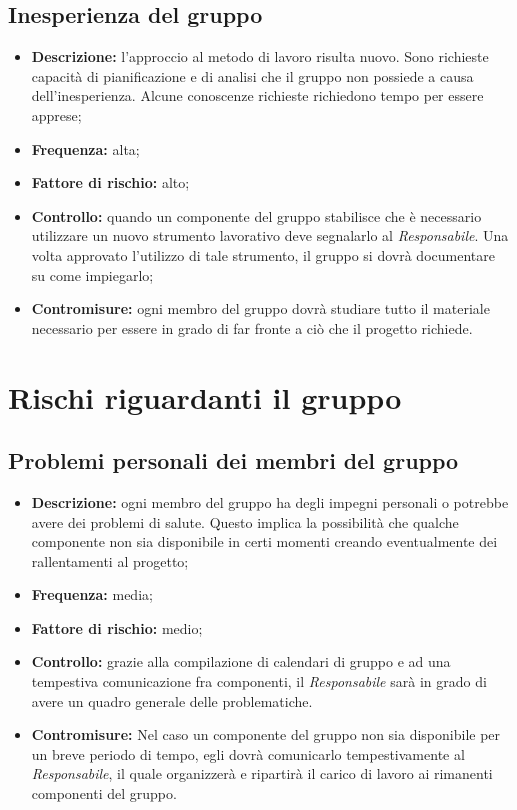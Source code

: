 \documentclass[./PianodiProgetto.tex]{subfiles}
\begin{document}
	\subsection{Inesperienza del gruppo}
	\begin{itemize}
		\item \textbf{Descrizione:} l'approccio al metodo di lavoro risulta nuovo. Sono richieste capacità di pianificazione e di analisi che il gruppo non possiede a causa dell'inesperienza. Alcune conoscenze richieste richiedono tempo per essere apprese;
		\item \textbf{Frequenza:} alta;
		\item \textbf{Fattore di rischio:} alto;
		\item \textbf{Controllo:} quando un componente del gruppo stabilisce che è necessario utilizzare un nuovo strumento lavorativo deve segnalarlo al  \textit{Responsabile}. Una volta approvato l'utilizzo di tale strumento, il gruppo si dovrà documentare su come impiegarlo;
		\item \textbf{Contromisure:} ogni membro del gruppo dovrà studiare tutto il materiale necessario per essere in grado di far fronte  a ciò che il progetto richiede.
	\end{itemize}
	
	\section{Rischi riguardanti il gruppo}
	\subsection{Problemi personali dei membri del gruppo}
	\begin{itemize}
		\item \textbf{Descrizione:} ogni membro del gruppo ha degli impegni personali o potrebbe avere dei problemi di salute. Questo implica la possibilità che qualche componente non sia disponibile in certi momenti creando eventualmente dei rallentamenti al progetto;
		\item \textbf{Frequenza:} media;
		\item \textbf{Fattore di rischio:} medio;
		\item \textbf{Controllo:} grazie alla compilazione di calendari di gruppo e ad una tempestiva comunicazione fra componenti, il \textit{Responsabile} sarà in grado di avere un quadro generale delle problematiche.
		\item \textbf{Contromisure:} Nel caso un componente del gruppo non sia disponibile per un breve periodo di tempo, egli dovrà comunicarlo tempestivamente al \textit{Responsabile}, il quale organizzerà e ripartirà il carico di lavoro ai rimanenti componenti del gruppo. 
	\end{itemize}
	
\end{document}
